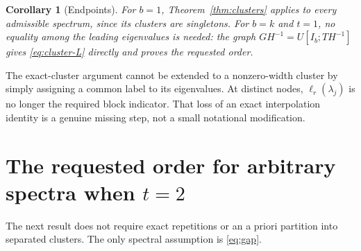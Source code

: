 \documentclass[11pt]{article}
\newtheorem{corollary}[theorem]{Corollary}
\theoremstyle{definition}
\begin{document}
\begin{corollary}[Endpoints]
\label{cor:t1}
For $b=1$, Theorem~\ref{thm:clusters} applies to every admissible spectrum,
since its clusters are singletons. For $b=k$ and $t=1$, no equality among the
leading eigenvalues is needed: the graph $GH^{-1}=U[I_b;TH^{-1}]$ gives
\eqref{eq:cluster-L} directly and proves the requested order.
\end{corollary}

The exact-cluster argument cannot be extended to a nonzero-width cluster by
simply assigning a common label to its eigenvalues. At distinct nodes,
$\ell_r(\lambda_j)$ is no longer the required block indicator. That loss of
an exact interpolation identity is a genuine missing step, not a small
notational modification.

\section{The requested order for arbitrary spectra when \texorpdfstring{$t=2$}{t=2}}
\label{sec:t2}

The next result does not require exact repetitions or an a priori partition
into separated clusters. The only spectral assumption is \eqref{eq:gap}.
\end{document}
